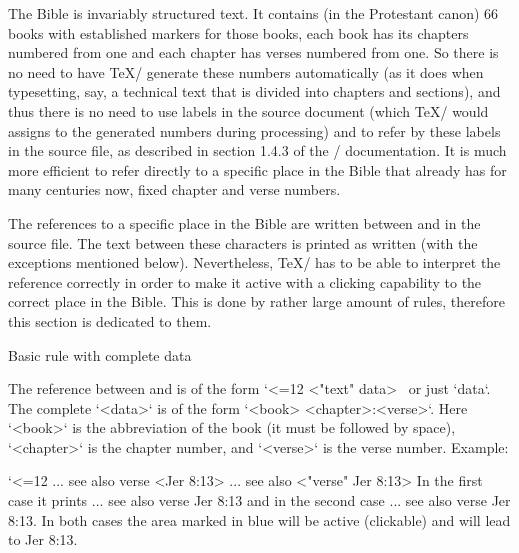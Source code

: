 The Bible is invariably
structured text. It contains (in the Protestant canon) 66 books with established markers for those books,
each book has its chapters numbered from one and each chapter has verses
numbered from one. So there is no need to have \TeX/ generate these numbers
automatically (as it does when typesetting, say, a technical text that is divided into
chapters and sections), and thus there is no need to use labels in the source
document (which \TeX/ would assigns to the generated numbers during processing) and to refer by these labels in the source file, 
as described in section 1.4.3 of the \OpTeX/ documentation. 
It is much more efficient to refer directly to a specific place in the Bible that already has
for many centuries now,  fixed chapter and verse numbers.


 
 
The references to a specific place in the Bible are written between \code{<} and \code{>} in the source file.
The text between these characters is printed as written (with the exceptions mentioned below). 
Nevertheless, \TeX/ has to be able to interpret the reference correctly in order to
make it active with a clicking capability to the correct place in the Bible. This is done by
rather large amount of rules, therefore this section is dedicated to them.


\secc[uudaj] Basic rule with complete data

The reference between \code{<} and \code{>} is of the form 
\begtt\catcode`<=12
<"text" data>
\endtt
\ or just \code{<}`data`\code{>}. 
The complete `<data>` is of the form `<book> <chapter>:<verse>`. Here `<book>` is the abbreviation of the book (it must be followed by
space), `<chapter>` is the chapter number, and `<verse>` is the verse number.
Example:

\begtt \catcode`<=12
... see also verse <Jer 8:13>
... see also <"verse" Jer 8:13>
\endtt
In the first case it prints ... see also verse {\Blue Jer 8:13} and in the second case
... see also {\Blue verse Jer 8:13}. 
In both cases the area marked in blue will be active (clickable) and will lead to Jer 8:13.


